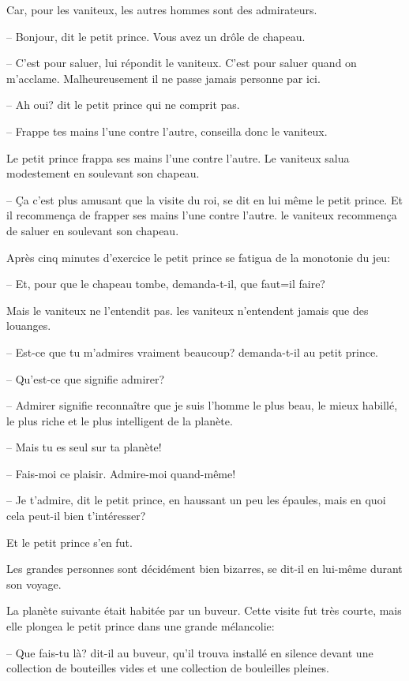 \documentclass[a4paper]{report}
\begin{document}

Car, pour les vaniteux, les autres hommes sont des admirateurs.

-- Bonjour, dit le petit prince. Vous avez un drôle de chapeau.

-- C'est pour saluer, lui répondit le vaniteux. C'est pour saluer quand on m'acclame. Malheureusement il ne passe jamais personne par ici.

-- Ah oui? dit le petit prince qui ne comprit pas.

-- Frappe tes mains l'une contre l'autre, conseilla donc le vaniteux.

Le petit prince frappa ses mains l'une contre l'autre. Le vaniteux salua modestement en soulevant son chapeau.

-- Ça c'est plus amusant que la visite du roi, se dit en lui même le petit prince. Et il recommença de frapper ses mains l'une contre l'autre. le vaniteux recommença de saluer en soulevant son chapeau.

Après cinq minutes d'exercice le petit prince se fatigua de la monotonie du jeu:

-- Et, pour que le chapeau tombe, demanda-t-il, que faut=il faire?

Mais le vaniteux ne l'entendit pas. les vaniteux n'entendent jamais que des louanges.

-- Est-ce que tu m'admires vraiment beaucoup? demanda-t-il au petit prince.

-- Qu'est-ce que signifie admirer?

-- Admirer signifie reconnaître que je suis l'homme le plus beau, le mieux habillé, le plus riche et le plus intelligent de la planète.

-- Mais tu es seul sur ta planète!

-- Fais-moi ce plaisir. Admire-moi quand-même!

-- Je t'admire, dit le petit prince, en haussant un peu les épaules, mais en quoi cela peut-il bien t'intéresser?

Et le petit prince s'en fut.

Les grandes personnes sont décidément bien bizarres, se dit-il en lui-même durant son voyage.

\parachapter{} %
La planète suivante était habitée par un buveur. Cette visite fut très courte, mais elle plongea le petit prince dans une grande mélancolie:

-- Que fais-tu là? dit-il au buveur, qu'il trouva installé en silence devant une collection de bouteilles vides et une collection de bouleilles pleines.
\end{document}
